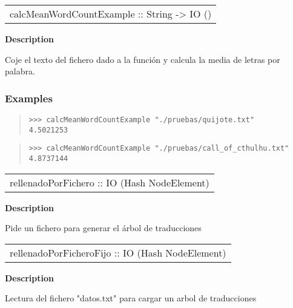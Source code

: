 \begin{haddockdesc}
\item[\begin{tabular}{@{}l}
calcMeanWordCountExample :: String -> IO ()
\end{tabular}]
{\haddockbegindoc
\textbf{Description}\par
Coje el texto del fichero dado a la función y calcula la media de letras por palabra.\par
\subsubsection*{\textbf{Examples}}
\begin{quote}
{\haddockverb\begin{verbatim}
>>> calcMeanWordCountExample "./pruebas/quijote.txt"
4.5021253

\end{verbatim}}
\end{quote}
\begin{quote}
{\haddockverb\begin{verbatim}
>>> calcMeanWordCountExample "./pruebas/call_of_cthulhu.txt"
4.8737144

\end{verbatim}}
\end{quote}}
\end{haddockdesc}
\begin{haddockdesc}
\item[\begin{tabular}{@{}l}
rellenadoPorFichero :: IO (Hash NodeElement)
\end{tabular}]
{\haddockbegindoc
\textbf{Description}\par
Pide un fichero para generar el árbol de traducciones\par}
\end{haddockdesc}
\begin{haddockdesc}
\item[\begin{tabular}{@{}l}
rellenadoPorFicheroFijo :: IO (Hash NodeElement)
\end{tabular}]
{\haddockbegindoc
\textbf{Description}\par
Lectura del fichero "datos.txt" para cargar un arbol de traducciones\par}
\end{haddockdesc}
